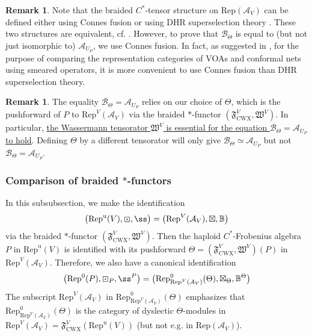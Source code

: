 \documentclass[11pt,b5paper,notitlepage]{article}
\theoremstyle{definition}
\newtheorem{rem}[df]{Remark}
\theoremstyle{plain}
\newcommand{\fk}{\mathfrak}
\newcommand{\mc}{\mathcal}
\newcommand{\Rep}{\mathrm{Rep}}
\newcommand{\uni}{\mathrm{u}}
\newcommand{\RepV}{{\mathrm{Rep}^\uni(V)}}
\newcommand{\CWX}{{\scriptscriptstyle \mathrm{CWX}}}
\numberwithin{equation}{section}
\begin{document}
\begin{rem}
Note that the braided $C^*$-tensor structure on $\Rep(\mc A_V)$ can be defined either using Connes fusion or using DHR superselection theory \cite{FRS89,FRS92}. These two structures are equivalent, cf. \cite[Sec. 6]{Gui21a}. However, to prove that $\mc B_\Theta$ is equal to (but not just isomorphic to) $\mc A_{U_P}$, we use Connes fusion. In fact, as suggested in \cite{Gui21a,Gui20}, for the purpose of comparing the representation categories of VOAs and conformal nets using smeared operators, it is more convenient to use Connes fusion than DHR superselection theory. 
\end{rem}

\begin{rem}
The equality $\mc B_\Theta=\mc A_{U_P}$ relies on our choice of $\Theta$, which is the pushforward of $P$ to $\Rep^V(\mc A_V)$ via the braided $*$-functor $(\fk F^V_\CWX,\fk W^V)$. In particular, \uline{the Wassermann tensorator $\fk W^V$ is essential for the equation $\mc B_\Theta=\mc A_{U_P}$ to hold}. Defining $\Theta$ by a different tensorator will only give $\mc B_\Theta\simeq\mc A_{U_P}$ but not $\mc B_\Theta=\mc A_{U_P}$.
\end{rem}



\subsubsection{Comparison of braided $*$-functors}\label{lb110}


In this subsubsection, we make the identification
\begin{align}\label{eq103}
\big(\RepV,\boxdot,\ss\big)=\big(\Rep^V(\mc A_V),\boxtimes,\mathbb B\big)
\end{align}
via the braided $*$-functor $(\fk F^V_\CWX,\fk W^V)$. Then the haploid $C^*$-Frobenius algebra $P$ in $\RepV$ is identified with its pushforward $\Theta=(\fk F^V_\CWX,\fk W^V)(P)$ in $\Rep^V(\mc A_V)$. Therefore, we also have a canonical identification
\begin{align}\label{eq102}
\big(\Rep^0(P),\boxdot_P,\ss^P\big)=\big(\Rep^0_{\Rep^V(\mc A_V)}(\Theta),\boxtimes_\Theta,\mathbb B^\Theta\big)
\end{align}
The subscript $\Rep^V(\mc A_V)$ in $\Rep^0_{\Rep^V(\mc A_V)}(\Theta)$ emphasizes that $\Rep^0_{\Rep^V(\mc A_V)}(\Theta)$ is the category of dyslectic $\Theta$-modules in $\Rep^V(\mc A_V)=\fk F^V_\CWX(\RepV)$ (but not e.g. in $\Rep(\mc A_V)$).
\end{document}
